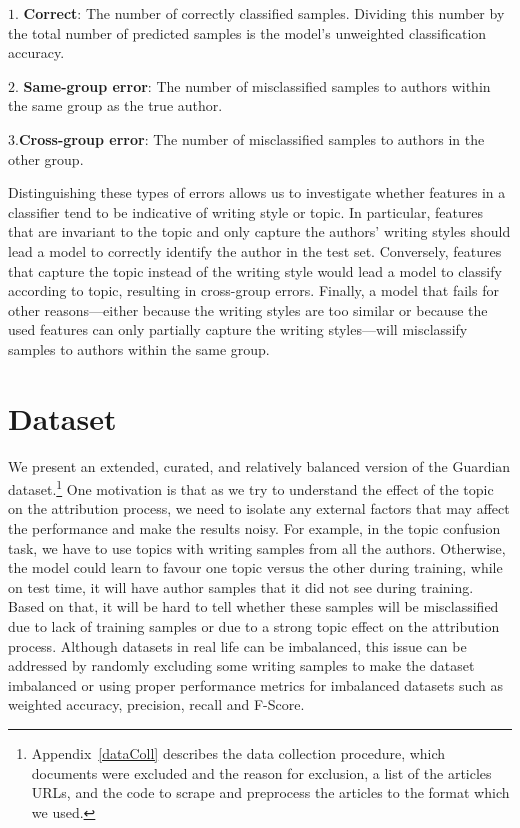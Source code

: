 \documentclass[11pt]{article}
\begin{document}
\noindent$1.$ \textbf{Correct}: The number of correctly classified samples. Dividing this number by the total number of predicted samples is the model's unweighted classification accuracy.

\noindent$2.$ \textbf{Same-group error}: The number of misclassified samples to authors within the same group as the true author.

\noindent$3.$\textbf{Cross-group error}: The number of misclassified samples to authors in the other group.

Distinguishing these types of errors allows us to investigate whether features in a classifier tend to be indicative of writing style or topic. In particular, features that are invariant to the topic and only capture the authors' writing styles should lead a model to correctly identify the author in the test set. Conversely, features that capture the topic instead of the writing style would lead a model to classify according to topic, resulting in cross-group errors. Finally, a model that fails for other reasons---either because the writing styles are too similar or because the used features can only partially capture the writing styles---will misclassify samples to authors within the same group.


\section{Dataset\label{subsec:dataset}}
We present an extended, curated, and relatively balanced version of the Guardian dataset.\footnote{Appendix~\ref{dataColl} describes the data collection procedure, which documents were excluded and the reason for exclusion, a list of the articles URLs, and the code to scrape and preprocess the articles to the format which we used.} One motivation is that as we try to understand the effect of the topic on the attribution process, we need to isolate any external factors that may affect the performance and make the results noisy. For example, in the topic confusion task, we have to use topics with writing samples from all the authors. Otherwise, the model could learn to favour one topic versus the other during training, while on test time, it will have author samples that it did not see during training. Based on that, it will be hard to tell whether these samples will be misclassified due to lack of training samples or due to a strong topic effect on the attribution process. Although datasets in real life can be imbalanced, this issue can be addressed by randomly excluding some writing samples to make the dataset imbalanced or using proper performance metrics for imbalanced datasets such as weighted accuracy, precision, recall and F-Score. 
\end{document}
